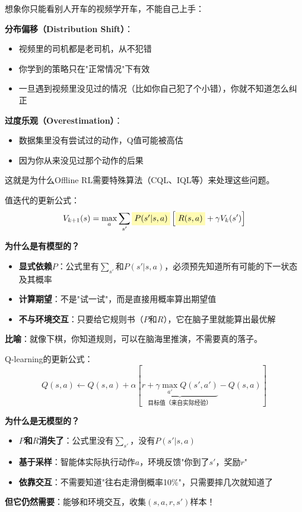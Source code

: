 \documentclass[11pt,a4paper]{article}
\theoremstyle{definition}
\begin{document}
\begin{plainwords}
想象你只能看别人开车的视频学开车，不能自己上手：

\textbf{分布偏移（Distribution Shift）}：
\begin{itemize}
    \item 视频里的司机都是老司机，从不犯错
    \item 你学到的策略只在"正常情况"下有效
    \item 一旦遇到视频里没见过的情况（比如你自己犯了个小错），你就不知道怎么纠正
\end{itemize}

\textbf{过度乐观（Overestimation）}：
\begin{itemize}
    \item 数据集里没有尝试过的动作，Q值可能被高估
    \item 因为你从来没见过那个动作的后果
\end{itemize}

这就是为什么Offline RL需要特殊算法（CQL、IQL等）来处理这些问题。
\end{plainwords}

\begin{keypoint}
值迭代的更新公式：
\[
V_{k+1}(s) = \max_a \sum_{s'} \colorbox{yellow!30}{$P(s'|s,a)$} \left[\colorbox{yellow!30}{$R(s,a)$} + \gamma V_k(s')\right]
\]

\textbf{为什么是有模型的？}
\begin{itemize}
    \item \textbf{显式依赖$P$}：公式里有$\sum_{s'}$和$P(s'|s,a)$，必须预先知道所有可能的下一状态及其概率
    \item \textbf{计算期望}：不是"试一试"，而是直接用概率算出期望值
    \item \textbf{不与环境交互}：只要给它规则书（$P$和$R$），它在脑子里就能算出最优解
\end{itemize}

\textbf{比喻}：就像下棋，你知道规则，可以在脑海里推演，不需要真的落子。
\end{keypoint}

\begin{keypoint}
Q-learning的更新公式：
\[
Q(s,a) \leftarrow Q(s,a) + \alpha\left[\underbrace{r + \gamma \max_{a'} Q(s', a')}_{\text{目标值（来自实际经验）}} - Q(s,a)\right]
\]

\textbf{为什么是无模型的？}
\begin{itemize}
    \item \textbf{$P$和$R$消失了}：公式里没有$\sum_{s'}$，没有$P(s'|s,a)$
    \item \textbf{基于采样}：智能体实际执行动作$a$，环境反馈"你到了$s'$，奖励$r$"
    \item \textbf{依靠交互}：不需要知道"往右走滑倒概率10\%"，只需要摔几次就知道了
\end{itemize}

\textbf{但它仍然需要}：能够和环境交互，收集$(s, a, r, s')$样本！
\end{keypoint}
\end{document}
